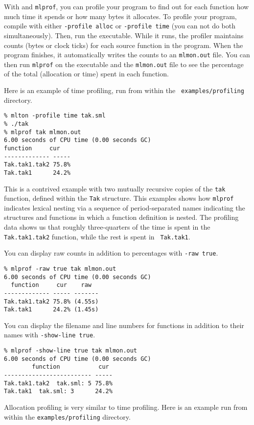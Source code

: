 
With {\mlton} and {\tt mlprof}, you can profile your program to find
out for each function how much time it spends or how many bytes it
allocates.  To profile your program, compile with either {\tt -profile
alloc} or {\tt -profile time} (you can not do both simultaneously).
Then, run the executable.  While it runs, the profiler maintains
counts (bytes or clock ticks) for each source function in the program.
When the program finishes, it automatically writes the counts to an
{\tt mlmon.out} file.  You can then run {\tt mlprof} on the executable
and the {\tt mlmon.out} file to see the percentage of the total
(allocation or time) spent in each function.

Here is an example of time profiling, run from within the {\tt
examples/profiling} directory.
\begin{verbatim}
% mlton -profile time tak.sml
% ./tak
% mlprof tak mlmon.out
6.00 seconds of CPU time (0.00 seconds GC)
function     cur 
------------- -----
Tak.tak1.tak2 75.8%
Tak.tak1      24.2%
\end{verbatim}
This is a contrived example with two mutually recursive copies of the
{\tt tak} function, defined within the {\tt Tak} structure.  This
examples shows how {\tt mlprof} indicates lexical nesting via a
sequence of period-separated names indicating the structures and
functions in which a function definition is nested.  The profiling
data shows us that roughly three-quarters of the time is spent in the
{\tt Tak.tak1.tak2} function, while the rest is spent in {\tt
Tak.tak1}.

You can display raw counts in addition to percentages with {\tt -raw
true}.
\begin{verbatim}
% mlprof -raw true tak mlmon.out
6.00 seconds of CPU time (0.00 seconds GC)
  function     cur    raw  
------------- ----- -------
Tak.tak1.tak2 75.8% (4.55s)
Tak.tak1      24.2% (1.45s)
\end{verbatim}

You can display the filename and line numbers for functions in addition
to their names with {\tt -show-line true}.
\begin{verbatim}
% mlprof -show-line true tak mlmon.out
6.00 seconds of CPU time (0.00 seconds GC)
        function           cur 
------------------------- -----
Tak.tak1.tak2  tak.sml: 5 75.8%
Tak.tak1  tak.sml: 3      24.2%
\end{verbatim}

Allocation profiling is very similar to time profiling.  Here is an
example run from within the {\tt examples/profiling} directory.

